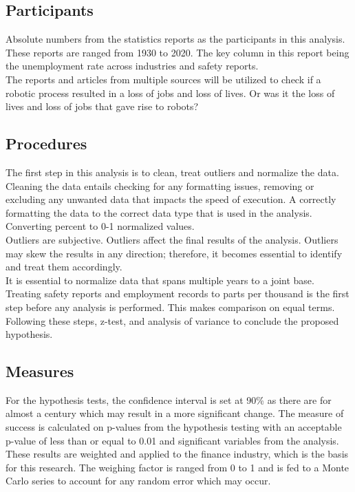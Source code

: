 \documentclass[
  man]{apa7}
\begin{document}
\hypertarget{participants}{%
\subsection{Participants}\label{participants}}

Absolute numbers from the statistics reports as the participants in this analysis. These reports are ranged from 1930 to 2020. The key column in this report being the unemployment rate across industries and safety reports.\\
The reports and articles from multiple sources will be utilized to check if a robotic process resulted in a loss of jobs and loss of lives. Or was it the loss of lives and loss of jobs that gave rise to robots?

\hypertarget{procedures}{%
\subsection{Procedures}\label{procedures}}

The first step in this analysis is to clean, treat outliers and normalize the data. Cleaning the data entails checking for any formatting issues, removing or excluding any unwanted data that impacts the speed of execution. A correctly formatting the data to the correct data type that is used in the analysis. Converting percent to 0-1 normalized values.\\
Outliers are subjective. Outliers affect the final results of the analysis. Outliers may skew the results in any direction; therefore, it becomes essential to identify and treat them accordingly.\\
It is essential to normalize data that spans multiple years to a joint base. Treating safety reports and employment records to parts per thousand is the first step before any analysis is performed. This makes comparison on equal terms.\\
Following these steps, z-test, and analysis of variance to conclude the proposed hypothesis.\\

\hypertarget{measures}{%
\subsection{Measures}\label{measures}}

For the hypothesis tests, the confidence interval is set at 90\% as there are for almost a century which may result in a more significant change. The measure of success is calculated on p-values from the hypothesis testing with an acceptable p-value of less than or equal to 0.01 and significant variables from the analysis.\\
These results are weighted and applied to the finance industry, which is the basis for this research. The weighing factor is ranged from 0 to 1 and is fed to a Monte Carlo series to account for any random error which may occur.
\end{document}
